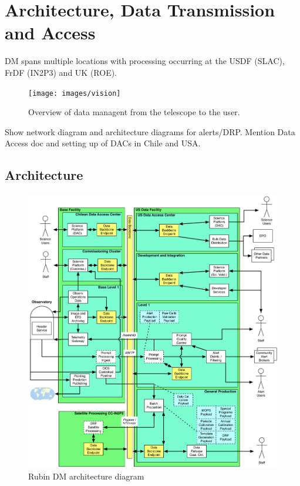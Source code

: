 \section {Architecture, Data Transmission and  Access } \label{sec:arch}
DM spans multiple locations with processing occurring at the USDF (SLAC), FrDF (IN2P3) and UK (ROE).
\begin{figure}
\begin{centering}
\texttt{[image: images/vision]}
	\caption{Overview of data managent from the telescope to the user. \label{fig:vision}}
\end{centering}
\end{figure}

Show network diagram and architecture diagrams for alerts/DRP. Mention Data Access doc  \cite{RDO-013} and
setting up of DACs in Chile and USA.

\subsection{Architecture}

\begin{figure}
\begin{centering}
\includegraphics[width=1.0\textwidth]{images/DMS_Architecture}
	\caption{Rubin DM architecture diagram \cite{LDM-148}\label{fig:arch}}
\end{centering}
\end{figure}

